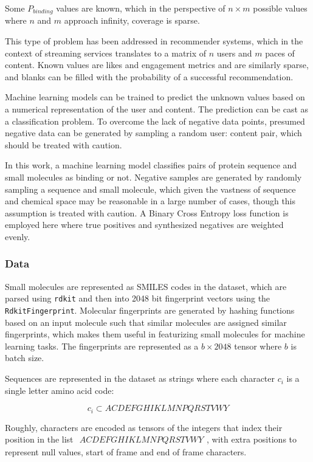 \documentclass{article}
\begin{document}
Some $P_{binding}$ values are known, which in the perspective of $n \times m$ possible values where $n$ and $m$ approach infinity, coverage is sparse.

This type of problem has been addressed in recommender systems, which in the context of streaming services translates to a matrix of $n$ users and $m$ paces of content.
Known values are likes and engagement metrics and are similarly sparse, and blanks can be filled with the probability of a successful recommendation.

Machine learning models can be trained to predict the unknown values based on a numerical representation of the user and content.
The prediction can be cast as a classification problem.
To overcome the lack of negative data points, presumed negative data can be generated by sampling a random user: content pair, which should be treated with caution.

In this work, a machine learning model classifies pairs of protein sequence and small molecules as binding or not.
Negative samples are generated by randomly sampling a sequence and small molecule, which given the vastness of sequence and chemical space may be reasonable in a large number of cases, though this assumption is treated with caution.
A Binary Cross Entropy loss function is employed here where true positives and synthesized negatives are weighted evenly.

\subsubsection{Data}

Small molecules are represented as SMILES codes in the dataset, which are parsed using \texttt{rdkit} and then into 2048 bit fingerprint vectors using the \texttt{RdkitFingerprint}.
Molecular fingerprints are generated by hashing functions based on an input molecule such that similar molecules are assigned similar fingerprints, which makes them useful in featurizing small molecules for machine learning tasks.
The fingerprints are represented as a $b \times 2048$ tensor where $b$ is batch size.

Sequences are represented in the dataset as strings where each character $c_i$ is a single letter amino acid code:

$$
c_i \subset{ACDEFGHIKLMNPQRSTVWY}
$$

Roughly, characters are encoded as tensors of the integers that index their position in the list $\begin{matrix} ACDEFGHIKLMNPQRSTVWY\end{matrix}$, with extra positions to represent null values, start of frame and end of frame characters.
\end{document}
